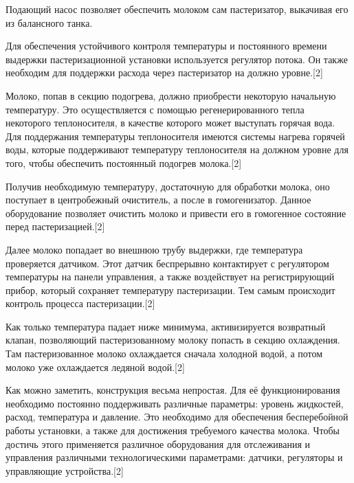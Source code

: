{  \par \redline Подающий насос позволяет обеспечить молоком сам пастеризатор, выкачивая его из балансного танка.

  \par \redline Для обеспечения устойчивого контроля температуры и постоянного времени выдержки пастеризационной установки используется регулятор потока. Он также необходим для поддержки расхода через пастеризатор на должно уровне.[2]

  \par \redline Молоко, попав в секцию подогрева, должно приобрести некоторую начальную температуру. Это осуществляется с помощью регенерированного тепла некоторого теплоносителя, в качестве которого может выступать горячая вода. Для поддержания температуры теплоносителя имеются системы нагрева горячей воды, которые поддерживают температуру теплоносителя на должном уровне для того, чтобы обеспечить постоянный подогрев молока.[2]

  \par \redline Получив необходимую температуру, достаточную для обработки молока, оно поступает в центробежный очиститель, а после в гомогенизатор. Данное оборудование позволяет очистить молоко и привести его в гомогенное состояние перед пастеризацией.[2]

  \par \redline Далее молоко попадает во внешнюю трубу выдержки, где температура проверяется датчиком. Этот датчик беспрерывно контактирует с регулятором температуры на панели управления, а также воздействует на регистрирующий прибор, который сохраняет температуру пастеризации. Тем самым происходит контроль процесса пастеризации.[2]

  \par \redline Как только температура падает ниже минимума, активизируется возвратный клапан, позволяющий пастеризованному молоку попасть в секцию охлаждения. Там пастеризованное молоко охлаждается сначала холодной водой, а потом молоко уже охлаждается ледяной водой.[2]

  \par \redline Как можно заметить, конструкция весьма непростая. Для её функционирования необходимо постоянно поддерживать различные параметры: уровень жидкостей, расход, температура и давление. Это необходимо для обеспечения бесперебойной работы установки, а также для достижения требуемого качества молока. Чтобы достичь этого применяется различное оборудования для отслеживания и управления различными технологическими параметрами: датчики, регуляторы и управляющие устройства.[2]

}
